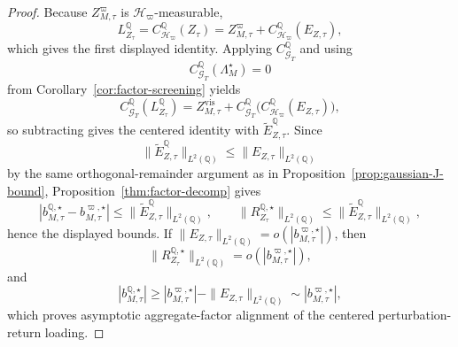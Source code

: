 \documentclass[11pt,a4paper]{amsart}
\theoremstyle{plain}
\theoremstyle{definition}
\theoremstyle{remark}
\newcommand{\QQ}{\mathbb{Q}}
\newcommand{\cG}{\mathcal{G}}
\newcommand{\cH}{\mathcal{H}}
\begin{document}
\begin{proof}
Because \(Z_{M,\tau}^{\varpi}\) is \(\cH_\varpi\)-measurable,
\[
        L_{Z_\tau}^\QQ
        =
        C_{\cH_\varpi}^\QQ(Z_\tau)
        =
        Z_{M,\tau}^{\varpi}
        +
        C_{\cH_\varpi}^\QQ(E_{Z,\tau}),
\]
which gives the first displayed identity.  Applying \(C_{\cG_T}^\QQ\) and using
\[
        C_{\cG_T}^\QQ(\Lambda_M^\star)=0
\]
from Corollary~\ref{cor:factor-screening} yields
\[
        C_{\cG_T}^\QQ(L_{Z_\tau}^\QQ)
        =
        Z_{M,\tau}^{\mathrm{vis}}
        +
        C_{\cG_T}^\QQ\bigl(C_{\cH_\varpi}^\QQ(E_{Z,\tau})\bigr),
\]
so subtracting gives the centered identity with \(\widetilde E_{Z,\tau}^\QQ\).  Since
\[
        \|\widetilde E_{Z,\tau}^\QQ\|_{L^2(\QQ)}
        \le
        \|E_{Z,\tau}\|_{L^2(\QQ)}
\]
by the same orthogonal-remainder argument as in Proposition~\ref{prop:gaussian-J-bound},
Proposition~\ref{thm:factor-decomp} gives
\[
        \left|
                b_{M,\tau}^{\QQ,\star}
                -
                b_{M,\tau}^{\varpi,\star}
        \right|
        \le
        \|\widetilde E_{Z,\tau}^\QQ\|_{L^2(\QQ)},
        \qquad
        \|R_{Z_\tau}^{\QQ,\star}\|_{L^2(\QQ)}
        \le
        \|\widetilde E_{Z,\tau}^\QQ\|_{L^2(\QQ)},
\]
hence the displayed bounds.  If
\(\|E_{Z,\tau}\|_{L^2(\QQ)}=o(|b_{M,\tau}^{\varpi,\star}|)\), then
\[
        \|R_{Z_\tau}^{\QQ,\star}\|_{L^2(\QQ)}
        =
        o\!\left(|b_{M,\tau}^{\varpi,\star}|\right),
\]
and
\[
        |b_{M,\tau}^{\QQ,\star}|
        \ge
        |b_{M,\tau}^{\varpi,\star}|-\|E_{Z,\tau}\|_{L^2(\QQ)}
        \sim
        |b_{M,\tau}^{\varpi,\star}|,
\]
which proves asymptotic aggregate-factor alignment of the centered perturbation-return loading.
\end{proof}
\end{document}
